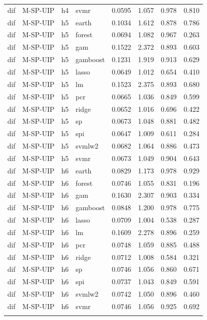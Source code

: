 \begin{ThreePartTable}
\begin{longtable}[t]{llclcccc}
dif & M-SP-UIP & h4 & svmr & 0.0595 & 1.057 & 0.978 & 0.810\\
\addlinespace
dif & M-SP-UIP & h5 & earth & 0.1034 & 1.612 & 0.878 & 0.786\\
dif & M-SP-UIP & h5 & forest & 0.0694 & 1.082 & 0.967 & 0.263\\
dif & M-SP-UIP & h5 & gam & 0.1522 & 2.372 & 0.893 & 0.603\\
dif & M-SP-UIP & h5 & gamboost & 0.1231 & 1.919 & 0.913 & 0.629\\
dif & M-SP-UIP & h5 & lasso & 0.0649 & 1.012 & 0.654 & 0.410\\
dif & M-SP-UIP & h5 & lm & 0.1523 & 2.375 & 0.893 & 0.680\\
dif & M-SP-UIP & h5 & pcr & 0.0665 & 1.036 & 0.849 & 0.599\\
dif & M-SP-UIP & h5 & ridge & 0.0652 & 1.016 & 0.696 & 0.422\\
dif & M-SP-UIP & h5 & sp & 0.0673 & 1.048 & 0.881 & 0.482\\
dif & M-SP-UIP & h5 & spi & 0.0647 & 1.009 & 0.611 & 0.284\\
dif & M-SP-UIP & h5 & svmlw2 & 0.0682 & 1.064 & 0.886 & 0.473\\
dif & M-SP-UIP & h5 & svmr & 0.0673 & 1.049 & 0.904 & 0.643\\
\addlinespace
dif & M-SP-UIP & h6 & earth & 0.0829 & 1.173 & 0.978 & 0.929\\
dif & M-SP-UIP & h6 & forest & 0.0746 & 1.055 & 0.831 & 0.196\\
dif & M-SP-UIP & h6 & gam & 0.1630 & 2.307 & 0.903 & 0.334\\
dif & M-SP-UIP & h6 & gamboost & 0.0848 & 1.200 & 0.978 & 0.775\\
dif & M-SP-UIP & h6 & lasso & 0.0709 & 1.004 & 0.538 & 0.287\\
dif & M-SP-UIP & h6 & lm & 0.1609 & 2.278 & 0.896 & 0.259\\
dif & M-SP-UIP & h6 & pcr & 0.0748 & 1.059 & 0.885 & 0.488\\
dif & M-SP-UIP & h6 & ridge & 0.0712 & 1.008 & 0.584 & 0.321\\
dif & M-SP-UIP & h6 & sp & 0.0746 & 1.056 & 0.860 & 0.671\\
dif & M-SP-UIP & h6 & spi & 0.0737 & 1.043 & 0.849 & 0.591\\
dif & M-SP-UIP & h6 & svmlw2 & 0.0742 & 1.050 & 0.896 & 0.460\\
dif & M-SP-UIP & h6 & svmr & 0.0746 & 1.056 & 0.925 & 0.692\\
\addlinespace

\end{longtable}
\end{ThreePartTable}
